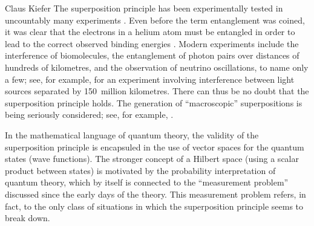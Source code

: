 \begin{artengenv}{Claus Kiefer}
The superposition principle has been experimentally tested
in uncountably many experiments \parencite{schlosshauer_decoherence:_2007,kiefer_albert_2015}.
Even before the term entanglement was coined, it was clear
that the electrons in a helium atom must be
entangled in order to lead to the correct observed binding energies 
\parencite{hylleraas_neue_1929}. Modern experiments include the interference of
biomolecules, the entanglement of photon pairs over distances of
hundreds of kilometres, and the observation of neutrino oscillations,
to name only a few; see, for example, \parencite{deng_quantum_2019}
for an experiment involving interference between light sources
separated by 150~million kilometres. There can thus be no doubt that
the superposition 
principle holds. The generation of ``macroscopic'' superpositions is
being seriously considered; see, for example, \parencite{clarke_growing_2018}. 
 
In the mathematical language of quantum theory,
the validity of the superposition principle is encapsuled in the use
of vector spaces for the quantum states (wave functions). The stronger
concept of a Hilbert space (using a scalar product between states) is
motivated by the probability interpretation of quantum theory, which
by itself is connected to the ``measurement problem'' discussed since
the early days of the theory. This measurement problem refers, in
fact, to the only class of situations in which the superposition
principle seems to break down.


\end{artengenv}
